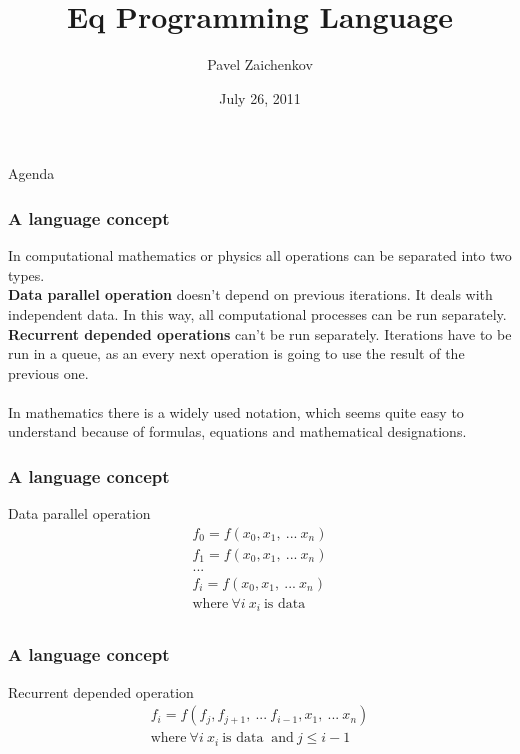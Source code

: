 \documentclass[xcolor=dvipsnames,mathserif,professionalfont,12pt]{beamer}
\title[Eq Programming Language]{Eq Programming Language}
\author[Pavel Zaichenkov]{Pavel Zaichenkov}
\institute[UoH]{University of Hertfordshire}
\date{July 26, 2011}
\begin{document}
\begin{frame}
  \titlepage
\end{frame}

\begin{frame}{Agenda}
  \tableofcontents
\end{frame}

\begin{frame}[fragile]
  \frametitle{A language concept}
  In computational mathematics or physics all operations can be separated into
  two types. \\
  \textbf{Data parallel operation} doesn't depend on previous iterations. It
  deals with independent data. In this way, all computational processes can be
  run separately.\\ 
  \textbf{Recurrent depended operations} can't be run separately. Iterations
  have to be run in a queue, as an every next operation is going to use the result
  of the previous one. \\ 
\quad \\
  In mathematics there is a widely used notation, which seems quite easy to
  understand because of formulas, equations and mathematical designations. 
\end{frame}

\begin{frame}[fragile]
  \frametitle{A language concept}
  \begin{block}{Data parallel operation}
  \begin{align*}
f_0=f(x_0, x_1,\ ...\ x_n) \\
f_1=f(x_0, x_1,\ ...\ x_n) \\
 ... \quad \ \  \\
f_i=f(x_0, x_1,\ ...\ x_n) \\
\text{where}\  \forall i\ x_i\  \text{is data }  \\
    \end{align*}
  \end{block}
\end{frame}

\begin{frame}[fragile]
  \frametitle{A language concept}
  \begin{block}{Recurrent depended operation}
\begin{align*}
f_i=f(f_j, f_{j+1},\ ...\ f_{i-1}, x_1,\ ...\ x_n) \\
\text{where}\ \forall i\ x_i\  \text{is data } \  \text{and}\  j \leq i-1 \\
\end{align*}
  \end{block}
\end{frame}
\end{document}
